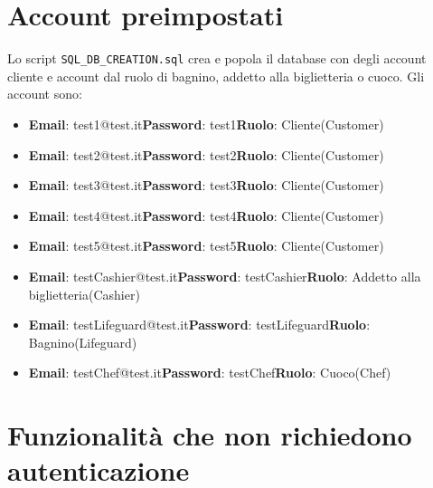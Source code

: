 \documentclass{article}
\begin{document}
\section{Account preimpostati}
Lo script \texttt{SQL\_DB\_CREATION.sql} crea e popola il database con degli account cliente e account dal ruolo di bagnino, addetto alla biglietteria o cuoco.
Gli account sono:
\begin{itemize}
	\item \textbf{Email}: test1@test.it\newline\textbf{Password}: test1\newline\textbf{Ruolo}: Cliente(Customer)
	\item \textbf{Email}: test2@test.it\newline\textbf{Password}: test2\newline\textbf{Ruolo}: Cliente(Customer)
	\item \textbf{Email}: test3@test.it\newline\textbf{Password}: test3\newline\textbf{Ruolo}: Cliente(Customer)
	\item \textbf{Email}: test4@test.it\newline\textbf{Password}: test4\newline\textbf{Ruolo}: Cliente(Customer)
	\item \textbf{Email}: test5@test.it\newline\textbf{Password}: test5\newline\textbf{Ruolo}: Cliente(Customer)
	\item \textbf{Email}: testCashier@test.it\newline\textbf{Password}: testCashier\newline\textbf{Ruolo}: Addetto alla biglietteria(Cashier)
	\item \textbf{Email}: testLifeguard@test.it\newline\textbf{Password}: testLifeguard\newline\textbf{Ruolo}: Bagnino(Lifeguard)
	\item \textbf{Email}: testChef@test.it\newline\textbf{Password}: testChef\newline\textbf{Ruolo}: Cuoco(Chef)
\end{itemize}
\newpage
\section{Funzionalità che non richiedono autenticazione}
\end{document}
